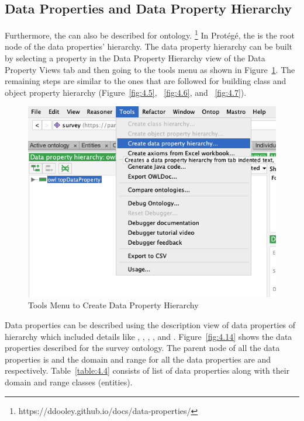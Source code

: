 \begin{doublespace}
\subsection{Data Properties and Data Property Hierarchy}
\par Furthermore, the  can also be described for ontology. \footnote{https://ddooley.github.io/docs/data-properties/} In Protégé, the  is the root node of the data properties' hierarchy. The data property hierarchy can be built by selecting a property in the Data Property Hierarchy view of the Data Property Views tab and then going to the tools menu as shown in Figure~\ref{fig:4.13}. The remaining steps are similar to the ones that are followed for building class and object property hierarchy (Figure~\ref{fig:4.5}, ~\ref{fig:4.6}, and ~\ref{fig:4.7}). 
\begin{figure}[htp]
    \centering
    \includegraphics[width=15cm]{images/ch4/Figure13.png}
    \caption{Tools Menu to Create Data Property Hierarchy}
    \label{fig:4.13}
\end{figure}
\par Data properties can be described using the description view of data properties of hierarchy which included details like , , , , and  . Figure~\ref{fig:4.14} shows the data properties described for the survey ontology. The parent node of all the data properties is  and the domain and range for all the data properties are  and  respectively. Table~\ref{table:4.4} consists of list of data properties along with their domain and range classes (entities).

\end{doublespace}
